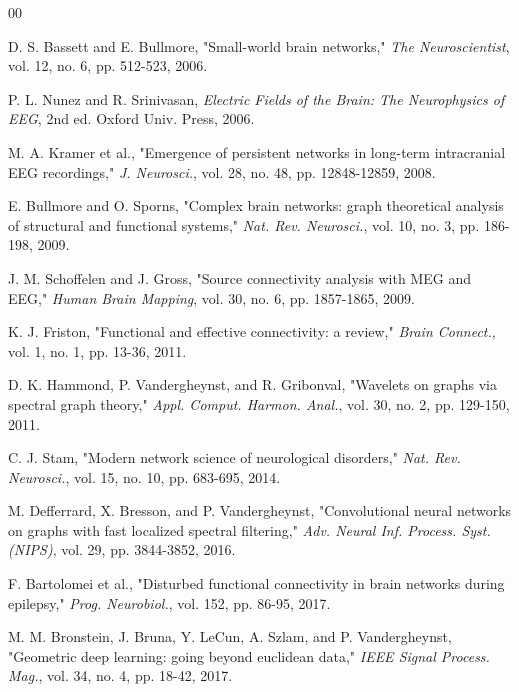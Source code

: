 \documentclass[journal]{IEEEtran}
\begin{document}

\begin{thebibliography}{00}

 D. S. Bassett and E. Bullmore, "Small-world brain networks," \textit{The Neuroscientist}, vol. 12, no. 6, pp. 512-523, 2006.

 P. L. Nunez and R. Srinivasan, \textit{Electric Fields of the Brain: The Neurophysics of EEG}, 2nd ed. Oxford Univ. Press, 2006.

 M. A. Kramer et al., "Emergence of persistent networks in long-term intracranial EEG recordings," \textit{J. Neurosci.}, vol. 28, no. 48, pp. 12848-12859, 2008.

 E. Bullmore and O. Sporns, "Complex brain networks: graph theoretical analysis of structural and functional systems," \textit{Nat. Rev. Neurosci.}, vol. 10, no. 3, pp. 186-198, 2009.

 J. M. Schoffelen and J. Gross, "Source connectivity analysis with MEG and EEG," \textit{Human Brain Mapping}, vol. 30, no. 6, pp. 1857-1865, 2009.


 K. J. Friston, "Functional and effective connectivity: a review," \textit{Brain Connect.}, vol. 1, no. 1, pp. 13-36, 2011.

 D. K. Hammond, P. Vandergheynst, and R. Gribonval, "Wavelets on graphs via spectral graph theory," \textit{Appl. Comput. Harmon. Anal.}, vol. 30, no. 2, pp. 129-150, 2011.


 C. J. Stam, "Modern network science of neurological disorders," \textit{Nat. Rev. Neurosci.}, vol. 15, no. 10, pp. 683-695, 2014.

 M. Defferrard, X. Bresson, and P. Vandergheynst, "Convolutional neural networks on graphs with fast localized spectral filtering," \textit{Adv. Neural Inf. Process. Syst. (NIPS)}, vol. 29, pp. 3844-3852, 2016.

 F. Bartolomei et al., "Disturbed functional connectivity in brain networks during epilepsy," \textit{Prog. Neurobiol.}, vol. 152, pp. 86-95, 2017.

 M. M. Bronstein, J. Bruna, Y. LeCun, A. Szlam, and P. Vandergheynst, "Geometric deep learning: going beyond euclidean data," \textit{IEEE Signal Process. Mag.}, vol. 34, no. 4, pp. 18-42, 2017.


\end{thebibliography}
\end{document}
